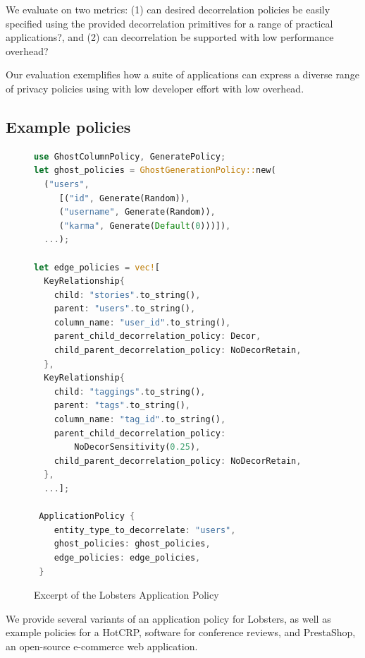 %

We evaluate \sys on two metrics: (1) can desired decorrelation policies be easily specified using the
provided decorrelation primitives for a range of practical applications?, and (2) can decorrelation
be supported with low performance overhead?

Our evaluation exemplifies how a suite of applications can express a diverse
range of privacy policies using \sys with low developer effort with low overhead.

\subsection{Example policies}
\begin{figure}
\begin{lstlisting}[language=Rust]
use GhostColumnPolicy, GeneratePolicy;
let ghost_policies = GhostGenerationPolicy::new(
  ("users", 
     [("id", Generate(Random)),
     ("username", Generate(Random)),
     ("karma", Generate(Default(0)))]),
  ...);

let edge_policies = vec![
  KeyRelationship{
    child: "stories".to_string(),
    parent: "users".to_string(),
    column_name: "user_id".to_string(),
    parent_child_decorrelation_policy: Decor,
    child_parent_decorrelation_policy: NoDecorRetain,
  },
  KeyRelationship{
    child: "taggings".to_string(),
    parent: "tags".to_string(),
    column_name: "tag_id".to_string(),
    parent_child_decorrelation_policy: 
        NoDecorSensitivity(0.25),
    child_parent_decorrelation_policy: NoDecorRetain,
  },
  ...];

 ApplicationPolicy {
    entity_type_to_decorrelate: "users",
    ghost_policies: ghost_policies,
    edge_policies: edge_policies,
 }
\end{lstlisting}
    \label{fig:lobsters_policy}
    \caption{Excerpt of the Lobsters Application Policy}
\end{figure}
We provide several variants of an application policy for Lobsters, as well as example policies for a
HotCRP, software for conference reviews, and PrestaShop, an
open-source e-commerce web application.

